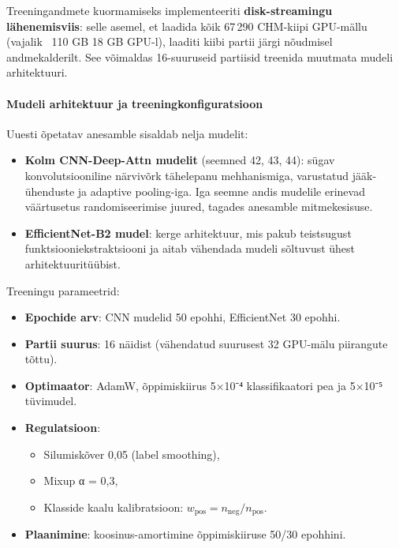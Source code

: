 Treeningandmete kuormamiseks implementeeriti \textbf{disk-streamingu lähenemisviis}:
selle asemel, et laadida kõik 67\,290 CHM-kiipi GPU-mällu (vajalik ~110 GB 18 GB GPU-l),
laaditi kiibi partii järgi nõudmisel andmekalderilt. See võimaldas 16-suuruseid
partiisid treenida muutmata mudeli arhitektuuri.

\paragraph{Mudeli arhitektuur ja treeningkonfiguratsioon}

Uuesti õpetatav anesamble sisaldab nelja mudelit:
\begin{itemize}
    \item \textbf{Kolm CNN-Deep-Attn mudelit} (seemned 42, 43, 44): sügav konvolutsiooniline
          närvivõrk tähelepanu mehhanismiga, varustatud jääk-ühenduste ja adaptive pooling-iga.
          Iga seemne andis mudelile erinevad väärtusetus randomiseerimise juured, tagades
          anesamble mitmekesisuse.
    \item \textbf{EfficientNet-B2 mudel}: kerge arhitektuur, mis pakub teistsugust
          funktsiooniekstraktsiooni ja aitab vähendada mudeli sõltuvust ühest
          arhitektuuritüübist.
\end{itemize}

Treeningu parameetrid:
\begin{itemize}
    \item \textbf{Epochide arv}: CNN mudelid 50 epohhi, EfficientNet 30 epohhi.
    \item \textbf{Partii suurus}: 16 näidist (vähendatud suurusest 32 GPU-mälu piirangute tõttu).
    \item \textbf{Optimaator}: AdamW, õppimiskiirus 5×10⁻⁴ klassifikaatori pea ja 5×10⁻⁵ tüvimudel.
    \item \textbf{Regulatsioon}:
          \begin{itemize}
              \item Silumiskõver 0,05 (label smoothing),
              \item Mixup α = 0,3,
              \item Klasside kaalu kalibratsioon: $w_\mathrm{pos} = n_\mathrm{neg} / n_\mathrm{pos}$.
          \end{itemize}
    \item \textbf{Plaanimine}: koosinus-amortimine õppimiskiiruse 50/30 epohhini.
\end{itemize}

